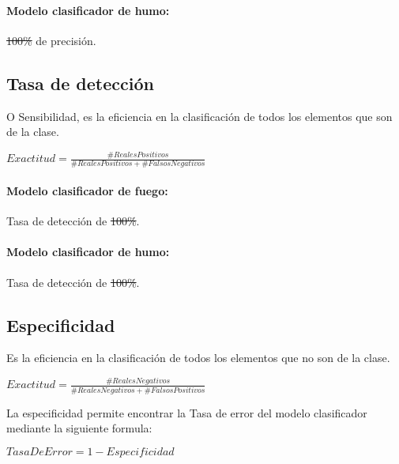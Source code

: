 \paragraph{Modelo clasificador de humo:} \sout{100\%} de precisión.

\subsection{Tasa de detección}

\noindent O Sensibilidad, es la eficiencia en la clasificación de todos los elementos que son de la clase.

\begin{center}
\begin{math}
Exactitud = \frac{\# RealesPositivos}{\# RealesPositivos + \# FalsosNegativos}
\end{math}
\end{center}

\paragraph{Modelo clasificador de fuego:} Tasa de detección de \sout{100\%}.

\paragraph{Modelo clasificador de humo:} Tasa de detección de \sout{100\%}.

\subsection{Especificidad}

\noindent Es la eficiencia en la clasificación de todos los elementos que no son de la clase.

\begin{center}
\begin{math}
Exactitud = \frac{\# Reales Negativos}{\# Reales Negativos + \# Falsos Positivos}
\end{math}
\end{center}

\noindent La especificidad permite encontrar la Tasa de error del modelo clasificador mediante la siguiente formula:

\begin{center}
\begin{math}
Tasa De Error = 1 - Especificidad
\end{math}
\end{center}

